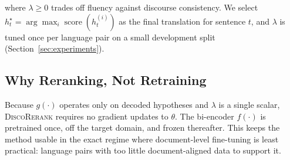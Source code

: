 \noindent where $\lambda \geq 0$ trades off fluency against discourse
consistency. We select $h_t^\star = \arg\max_i \operatorname{score}(h_t^{(i)})$
as the final translation for sentence $t$, and $\lambda$ is tuned once per
language pair on a small development split (Section~\ref{sec:experiments}).

\subsection{Why Reranking, Not Retraining}
Because $g(\cdot)$ operates only on decoded hypotheses and $\lambda$ is a
single scalar, \textsc{DiscoRerank} requires no gradient updates to
$\theta$. The bi-encoder $f(\cdot)$ is pretrained once, off the target
domain, and frozen thereafter. This keeps the method usable in the exact
regime where document-level fine-tuning is least practical: language pairs
with too little document-aligned data to support it.
